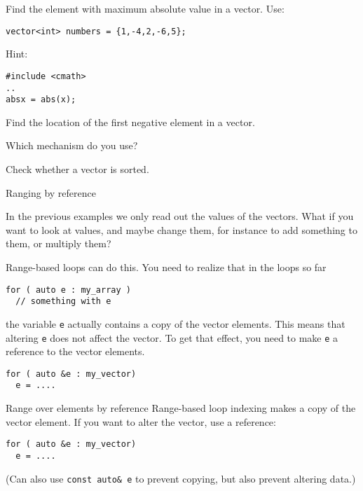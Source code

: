 \begin{exercise}
  \label{ex:array-max}
  Find the element with maximum absolute value in a vector. Use:
\begin{lstlisting}
vector<int> numbers = {1,-4,2,-6,5};
\end{lstlisting}

Hint:
\begin{lstlisting}
#include <cmath>
..
absx = abs(x);
\end{lstlisting}
\end{exercise}

\begin{exercise}
  \label{ex:array-maxidx}
  Find the location of the first negative element in a vector.

  Which mechanism do you use?
\end{exercise}

\begin{exercise}
  \label{ex:array-sorted}
  Check whether a vector is sorted.
\end{exercise}

 {Ranging by reference}

In the previous examples we only read out the values
of the vectors. What if you want to look at values,
and maybe change them,
for instance to add something to them, or multiply them?

Range-based loops can do this.
You need to realize that in the loops so far
\begin{lstlisting}
for ( auto e : my_array )
  // something with e  
\end{lstlisting}
the variable \lstinline{e} actually contains a copy of the vector elements.
This means that altering \lstinline{e} does not affect the vector.
To get that effect, you need to make \lstinline{e} a reference to the vector elements.

\begin{lstlisting}
for ( auto &e : my_vector)
  e = ....
\end{lstlisting}

\begin{slide}{Range over elements by reference}
  \label{sl:vector-range-ref}
  Range-based loop indexing makes a copy of the vector element. If you
  want to alter the vector, use a reference:
\begin{lstlisting}
for ( auto &e : my_vector)
  e = ....
\end{lstlisting}
%

(Can also use \lstinline{const auto& e} to prevent copying, but also
prevent altering data.)
\end{slide}


